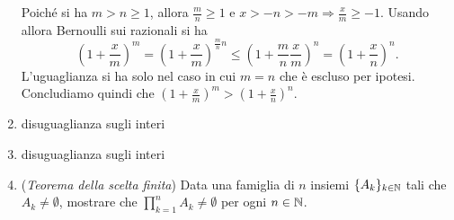 \begin{enumerate}
  Poiché si ha $ m > n \geq 1 $, allora $ \frac{m}{n} \geq 1 $ e $ x > -n > -m \Rightarrow \frac{x}{m} \geq -1 $. Usando allora Bernoulli sui razionali si ha \[\left(1 + \frac{x}{m}\right)^m = \left(1 + \frac{x}{m}\right)^{\frac{m}{n} n} \leq \left(1 + \frac{m}{n}\frac{x}{m}\right)^n = \left(1 + \frac{x}{n}\right)^n.\] L'uguaglianza si ha solo nel caso in cui $ m = n $ che è escluso per ipotesi. Concludiamo quindi che $ \left(1 + \frac{x}{m}\right)^m > \left(1 + \frac{x}{n}\right)^n $.
\item \textsf{disuguaglianza sugli interi}
\item \textsf{disuguaglianza sugli interi}
\item (\emph{Teorema della scelta finita}) Data una famiglia di $ n $ insiemi $ \{A_k\}_{k \in \mathbb{N}} $ tali che $ A_k \neq \emptyset $, mostrare che $ \prod_{k = 1}^{n} A_k \neq \emptyset $ per ogni $ n \in \mathbb{N} $. \\


\end{enumerate}
